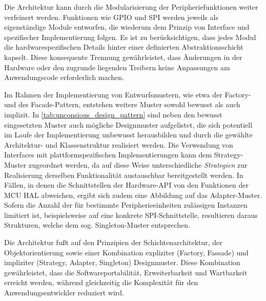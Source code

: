 Die Architektur kann durch die Modularisierung der Peripheriefunktionen weiter verfeinert werden. 
Funktionen wie GPIO und SPI werden jeweils als eigenständige Module entworfen, die wiederum dem Prinzip von Interface und spezifischer Implementierung folgen. 
Es ist zu berücksichtigen, dass jedes Modul die hardwarespezifischen Details hinter einer definierten Abstraktionsschicht kapselt. 
Diese konsequente Trennung gewährleistet, dass Änderungen in der Hardware oder den zugrunde liegenden Treibern keine Anpassungen am Anwendungscode erforderlich machen.

Im Rahmen der Implementierung von Entwurfsmustern, wie etwa der Factory- und des Facade-Pattern, entstehen weitere Muster sowohl bewusst als auch implizit. In \cref{tab:unconsious_design_pattern} sind neben den bewusst eingesetzten Muster auch mögliche Designmuster aufgelistet, die sich potentiell im Laufe der Implementierung unbewusst herausbilden und durch die gewählte Architektur- und Klassenstruktur realisiert werden.
Die Verwendung von Interfaces mit plattformspezifischen Implementierungen kann dem Strategy-Muster zugeordnet werden, da auf diese Weise unterschiedliche \textit{Strategien} zur Realisierung derselben Funktionalität austauschbar bereitgestellt werden.
In Fällen, in denen die Schnittstellen der Hardware-API von den Funktionen der MCU HAL abweichen, ergibt sich zudem eine Abbildung auf das Adapter-Muster. 
Sofern die Anzahl der für bestimmte Peripherieeinheiten zulässigen Instanzen limitiert ist, beispielsweise auf eine konkrete SPI-Schnittstelle, resultieren daraus Strukturen, welche dem sog. Singleton-Muster entsprechen. 

Die Architektur fußt auf den Prinzipien der Schichtenarchitektur, der Objektorientierung sowie einer Kombination expliziter (Factory, Fassade) und impliziter (Strategy, Adapter, Singleton) Designmuster. 
Diese Kombination gewährleistet, dass die Softwareportabilität, Erweiterbarkeit und Wartbarkeit erreicht werden, während gleichzeitig die Komplexität für den Anwendungsentwickler reduziert wird.

